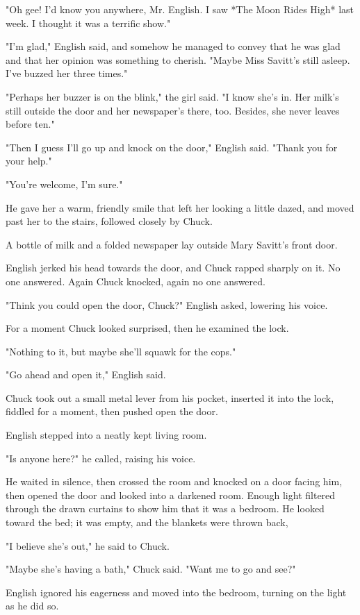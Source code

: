 \documentclass{novel}
\begin{document}
"Oh gee! I'd know you anywhere, Mr. English. I saw *The Moon Rides High* last week. I thought it was a terrific show."

"I'm glad," English said, and somehow he managed to convey that he was glad and that her opinion was something to cherish. "Maybe Miss Savitt's still asleep. I've buzzed her three times."

"Perhaps her buzzer is on the blink," the girl said. "I know she's in. Her milk's still outside the door and her newspaper's there, too. Besides, she never leaves before ten."

"Then I guess I'll go up and knock on the door," English said. "Thank you for your help."

"You're welcome, I'm sure."

He gave her a warm, friendly smile that left her looking a little dazed, and moved past her to the stairs, followed closely by Chuck.

A bottle of milk and a folded newspaper lay outside Mary Savitt's front door.

English jerked his head towards the door, and Chuck rapped sharply on it. No one answered. Again Chuck knocked, again no one answered.

"Think you could open the door, Chuck?" English asked, lowering his voice.

For a moment Chuck looked surprised, then he examined the lock.

"Nothing to it, but maybe she'll squawk for the cops."

"Go ahead and open it," English said.

Chuck took out a small metal lever from his pocket, inserted it into the lock, fiddled for a moment, then pushed open the door.

English stepped into a neatly kept living room.

"Is anyone here?" he called, raising his voice.

He waited in silence, then crossed the room and knocked on a door facing him, then opened the door and looked into a darkened room. Enough light filtered through the drawn curtains to show him that it was a bedroom. He looked toward the bed; it was empty, and the blankets were thrown back,

"I believe she's out," he said to Chuck.

"Maybe she's having a bath," Chuck said. "Want me to go and see?"

English ignored his eagerness and moved into the bedroom, turning on the light as he did so.
\end{document}
